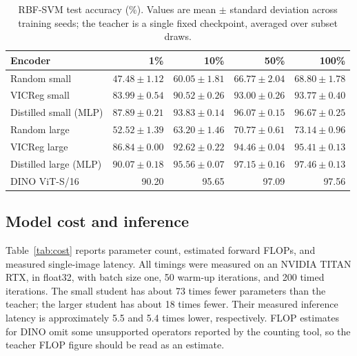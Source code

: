 \documentclass[10pt]{article}
\begin{document}
\begin{table}[H]
\centering
\caption{RBF-SVM test accuracy (\%). Values are mean $\pm$ standard
deviation across training seeds; the teacher is a single fixed checkpoint,
averaged over subset draws.}
\label{tab:rbf}
\scriptsize
\setlength{\tabcolsep}{4pt}
\begin{tabular}{lrrrr}
\toprule
Encoder & 1\% & 10\% & 50\% & 100\% \\
\midrule
Random small & $47.48\pm1.12$ & $60.05\pm1.81$ & $66.77\pm2.04$ & $68.80\pm1.78$ \\
VICReg small & $83.99\pm0.54$ & $90.52\pm0.26$ & $93.00\pm0.26$ & $93.77\pm0.40$ \\
Distilled small (MLP) & $87.89\pm0.21$ & $93.83\pm0.14$ & $96.07\pm0.15$ & $96.67\pm0.25$ \\
Random large & $52.52\pm1.39$ & $63.20\pm1.46$ & $70.77\pm0.61$ & $73.14\pm0.96$ \\
VICReg large & $86.84\pm0.00$ & $92.62\pm0.22$ & $94.46\pm0.04$ & $95.41\pm0.13$ \\
Distilled large (MLP) & $90.07\pm0.18$ & $95.56\pm0.07$ & $97.15\pm0.16$ & $97.46\pm0.13$ \\
DINO ViT-S/16 & 90.20 & 95.65 & 97.09 & 97.56 \\
\bottomrule
\end{tabular}
\end{table}

\subsection{Model cost and inference}

Table~\ref{tab:cost} reports parameter count, estimated forward FLOPs, and
measured single-image latency. All timings were measured on an NVIDIA
TITAN RTX, in float32, with batch size one, 50 warm-up iterations, and 200
timed iterations. The small student has about 73 times fewer parameters
than the teacher; the larger student has about 18 times fewer. Their
measured inference latency is approximately 5.5 and 5.4 times lower,
respectively. FLOP estimates for DINO omit some unsupported operators
reported by the counting tool, so the teacher FLOP figure should be read
as an estimate.
\end{document}

